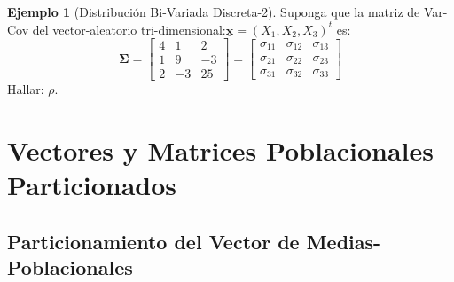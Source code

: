 \documentclass[
]{book}
\theoremstyle{definition}
\theoremstyle{definition}
\newtheorem{example}{Ejemplo}[chapter]
\theoremstyle{definition}
\theoremstyle{definition}
\theoremstyle{remark}
\begin{document}
\begin{example}[Distribución Bi-Variada Discreta-2]
\protect\hypertarget{exm:distrib-bivar-2}{}\label{exm:distrib-bivar-2}Suponga que la matriz de Var-Cov del vector-aleatorio tri-dimensional:\newline \(\underline{\mathbf{x}}=(X_1,X_2,X_3)^t\) es:
\[
\mathbf{\Sigma}=\begin{bmatrix}
4 & 1 & 2 \\
1 & 9 & -3 \\
2 & -3 & 25
\end{bmatrix}=
  \begin{bmatrix}
\sigma_{11} & \sigma_{12} & \sigma_{13}\\
\sigma_{21} & \sigma_{22} & \sigma_{23}\\
\sigma_{31} & \sigma_{32} & \sigma_{33}
\end{bmatrix}
\]
Hallar: \(\rho\).
\end{example}

\hypertarget{vectores-y-matrices-poblacionales-particionados}{%
\section{Vectores y Matrices Poblacionales Particionados}\label{vectores-y-matrices-poblacionales-particionados}}

\hypertarget{particionamiento-del-vector-de-medias-poblacionales}{%
\subsection{Particionamiento del Vector de Medias-Poblacionales}\label{particionamiento-del-vector-de-medias-poblacionales}}
\end{document}
